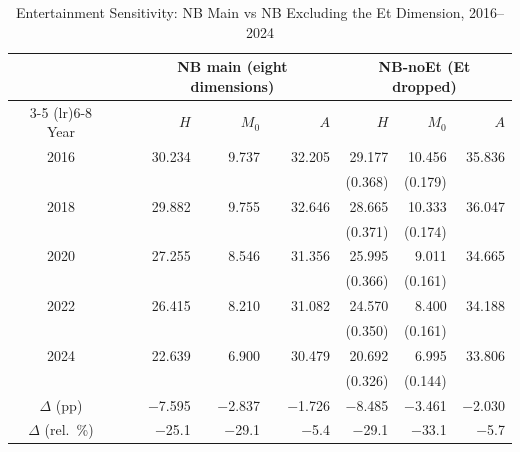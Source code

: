 \documentclass[11pt, a4paper]{article}
\begin{document}
\begin{table}[htb]
\centering
\caption{Entertainment Sensitivity: NB Main vs NB Excluding the Et Dimension, 2016--2024}
\small
\begin{tabularx}{\textwidth}{c X rrr rrr}
\toprule
\toprule
& & \multicolumn{3}{c}{NB main (eight dimensions)} & \multicolumn{3}{c}{NB-noEt (Et dropped)} \\
\cmidrule(lr){3-5} \cmidrule(lr){6-8}
Year & & $H$ & $M_0$ & $A$ & $H$ & $M_0$ & $A$ \\ \midrule
2016 & & 30.234 & 9.737 & 32.205 & 29.177 & 10.456 & 35.836 \\
     & &        &       &        & {\footnotesize (0.368)} & {\footnotesize (0.179)} & \\
2018 & & 29.882 & 9.755 & 32.646 & 28.665 & 10.333 & 36.047 \\
     & &        &       &        & {\footnotesize (0.371)} & {\footnotesize (0.174)} & \\
2020 & & 27.255 & 8.546 & 31.356 & 25.995 & 9.011  & 34.665 \\
     & &        &       &        & {\footnotesize (0.366)} & {\footnotesize (0.161)} & \\
2022 & & 26.415 & 8.210 & 31.082 & 24.570 & 8.400  & 34.188 \\
     & &        &       &        & {\footnotesize (0.350)} & {\footnotesize (0.161)} & \\
2024 & & 22.639 & 6.900 & 30.479 & 20.692 & 6.995  & 33.806 \\
     & &        &       &        & {\footnotesize (0.326)} & {\footnotesize (0.144)} & \\ \midrule
$\Delta$ (pp) & & $-$7.595 & $-$2.837 & $-$1.726 & $-$8.485 & $-$3.461 & $-$2.030 \\
$\Delta$ (rel.\ \%) & & $-$25.1 & $-$29.1 & $-$5.4 & $-$29.1 & $-$33.1 & $-$5.7 \\
\bottomrule
\end{tabularx}
\begin{justify}
\scriptsize

\end{justify}
\end{table}
\end{document}
